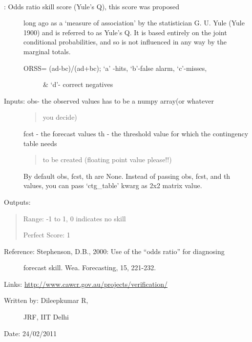 \documentclass[letterpaper,10pt,english]{sphinxmanual}
\begin{document}

\begin{fulllineitems}
\label{diagnosis:ctgfunction.orss}~\begin{description}
\item[{{\hyperref[diagnosis:ctgfunction.orss]{}}: Odds ratio skill score (Yule's Q), this score was proposed}] \leavevmode
long ago as a `measure of association' by the statistician
G. U. Yule (Yule 1900) and is referred to as Yule's Q. It is
based entirely on the joint conditional probabilities,
and so is not influenced in any way by the marginal totals.
\begin{description}
\item[{ORSS= (ad-bc)/(ad+bc); `a' -hits, `b'-false alarm, `c'-misses,}] \leavevmode
\& `d'- correct negatives

\end{description}

\item[{Inputs: obs- the observed values has to be a numpy array(or whatever}] \leavevmode\begin{quote}

you decide)
\end{quote}

fcst - the forecast values
th  - the threshold value for which the contingency table needs
\begin{quote}

to be created (floating point value please!!)
\end{quote}

By default obs, fcst, th are None. Instead of passing obs, fcst,
and th values, you can pass `ctg\_table' kwarg as 2x2 matrix value.

\end{description}

Outputs:
\begin{quote}

Range: -1 to 1, 0 indicates no skill

Perfect Score: 1
\end{quote}
\begin{description}
\item[{Reference: Stephenson, D.B., 2000: Use of the ``odds ratio'' for diagnosing}] \leavevmode
forecast skill. Wea. Forecasting, 15, 221-232.

\end{description}

Links: \href{http://www.cawcr.gov.au/projects/verification/}{http://www.cawcr.gov.au/projects/verification/}
\begin{description}
\item[{Written by: Dileepkumar R,}] \leavevmode
JRF, IIT Delhi

\end{description}

Date: 24/02/2011

\end{fulllineitems}
\end{document}
